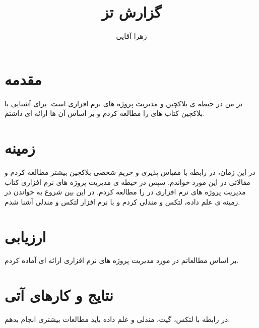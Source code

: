 \documentclass[a4paper, 11pt]{article}
\title{گزارش تز}
\author{زهرا آقایی}
\begin{document}
\maketitle
\tableofcontents

\section{مقدمه}

تز من در حیطه ی بلاکچین و مدیریت پروژه های نرم افزاری است. برای آشنایی با بلاکچین کتاب های 
را مطالعه کردم و بر اساس آن ها ارائه ای داشتم.

\pagebreak

\section{زمینه}

در این زمان، در رابطه با مقیاس پذیری و حریم شخصی بلاکچین بیشتر مطالعه کردم و مقالاتی در این مورد خواندم. سپس در حیطه ی مدیریت پروژه های نرم افزاری کتاب مدیریت پروژه های نرم افزاری در
 را مطالعه کردم. در این بین شروع به خواندن در زمینه ی علم داده، لتکس و مندلی کردم و با نرم افزار لتکس و مندلی آشنا شدم.

\pagebreak


\section{ارزیابی}

بر اساس مطالعاتم در مورد مدیریت پروژه های نرم افزاری ارائه ای آماده کردم. 

\pagebreak

\section{نتایج و کارهای آتی}

در رابطه با لتکس، گیت، مندلی و علم داده باید مطالعات بیشتری انجام بدهم.


\end{document}
